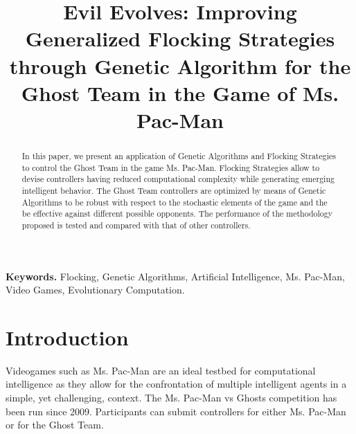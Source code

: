 \documentclass{llncs}
\begin{document}
%
%

\title{Evil Evolves: Improving Generalized Flocking Strategies through Genetic Algorithm for the Ghost Team in the Game of Ms. Pac-Man}

%
%

\maketitle

%
%
\begin{abstract} 
In this paper, we present an application of Genetic Algorithms and Flocking Strategies to control the Ghost Team in the game Ms. Pac-Man. Flocking Strategies allow to devise controllers having reduced computational complexity while generating emerging intelligent behavior. The Ghost Team controllers are optimized by means of Genetic Algorithms to be robust with respect to the stochastic elements of the game and the be effective against different possible opponents. The performance of the methodology proposed is tested and compared with that of other controllers.
\end{abstract}
\textbf{Keywords.} Flocking, Genetic Algorithms, Artificial Intelligence, Ms. Pac-Man, Video Games, Evolutionary Computation.

%
%
\section{Introduction}
\label{sec:intro}

Videogames such as Ms. Pac-Man are an ideal testbed for computational intelligence as they allow for the confrontation of multiple intelligent agents in a simple, yet challenging, context. The Ms. Pac-Man vs Ghosts competition has been run since 2009. Participants can submit controllers for either Ms. Pac-Man or for the Ghost Team.
\end{document}
